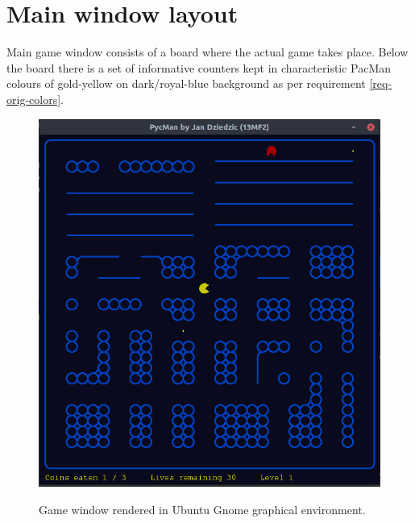\documentclass[11pt,a4paper]{report}
\newenvironment{img}{
	\begin{center}
		\begin{figure}[H]
			\begin{center}
			
}{
	\end{center}
		\end{figure}
			\end{center}
}
\begin{document}
		\section{Main window layout}
			Main game window consists of a board where the actual game takes place.
			Below the board there is a set of informative counters kept in characteristic PacMan colours of gold-yellow on dark/royal-blue background as per requirement \ref{req-orig-colors}.
			\begin{img}
				\includegraphics[width=350pt]{images/window-in-ubuntu}\\
				\caption{Game window rendered in Ubuntu Gnome graphical environment.}
			\end{img}
			
\end{document}
